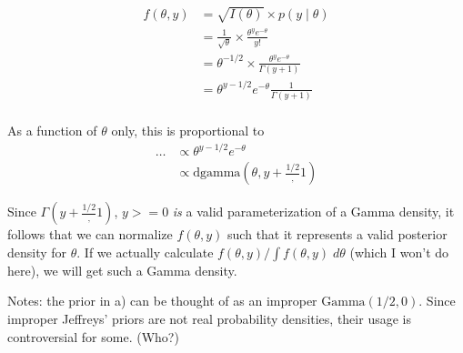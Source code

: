\documentclass[]{article}
\begin{document}
\begin{align}
f(\theta, y) &= \sqrt{I(\theta)} \times p(y \mid \theta) \\
&= \frac{1}{\sqrt{\theta}} \times  \frac{\theta^y e^{-\theta}}{y!} \\
&= \theta^{-1/2} \times  \frac{\theta^y e^{-\theta}}{\Gamma(y + 1)} \\
&= \theta^{y - 1/2} e^{-\theta} \frac{1}{\Gamma(y + 1)} \\
\end{align}

As a function of \(\theta\) only, this is proportional to \begin{align}
\dots &\propto \theta^{y - 1/2} e^{-\theta} \\
&\propto \text{dgamma}(\theta, y + \frac{1/2}, 1)
\end{align}

Since \(\Gamma(y + \frac{1/2}, 1)\), \(y >= 0\) \emph{is} a valid
parameterization of a Gamma density, it follows that we can normalize
\(f(\theta, y)\) such that it represents a valid posterior density for
\(\theta\). If we actually calculate
\(f(\theta, y) / \int f(\theta, y) \; d\theta\) (which I won't do here),
we will get such a Gamma density.

Notes: the prior in a) can be thought of as an improper
\(\text{Gamma}(1/2, 0)\). Since improper Jeffreys' priors are not real
probability densities, their usage is controversial for some. (Who?)
\end{document}
